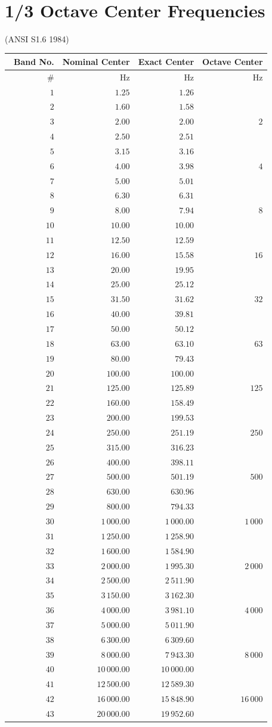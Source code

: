 \documentclass[
]{book}
\begin{document}
~

\hypertarget{octave-center-frequencies}{%
\section{1/3 Octave Center Frequencies}\label{octave-center-frequencies}}

(ANSI S1.6 1984)

\begin{longtable}[]{@{}rrrr@{}}
\toprule
~Band No. & Nominal Center & Exact Center & Octave Center\tabularnewline
\midrule
\endhead
\# & \(\text{Hz}\) & \(\text{Hz}\) & \(\text{Hz}\)\tabularnewline
\(1\) & \(1.25\) & \(1.26\) &\tabularnewline
\(2\) & \(1.60\) & \(1.58\) &\tabularnewline
\(3\) & \(2.00\) & \(2.00\) & \(2\)\tabularnewline
\(4\) & \(2.50\) & \(2.51\) &\tabularnewline
\(5\) & \(3.15\) & \(3.16\) &\tabularnewline
\(6\) & \(4.00\) & \(3.98\) & \(4\)\tabularnewline
\(7\) & \(5.00\) & \(5.01\) &\tabularnewline
\(8\) & \(6.30\) & \(6.31\) &\tabularnewline
\(9\) & \(8.00\) & \(7.94\) & \(8\)\tabularnewline
\(10\) & \(10.00\) & \(10.00\) &\tabularnewline
\(11\) & \(12.50\) & \(12.59\) &\tabularnewline
\(12\) & \(16.00\) & \(15.58\) & \(16\)\tabularnewline
\(13\) & \(20.00\) & \(19.95\) &\tabularnewline
\(14\) & \(25.00\) & \(25.12\) &\tabularnewline
\(15\) & \(31.50\) & \(31.62\) & \(32\)\tabularnewline
\(16\) & \(40.00\) & \(39.81\) &\tabularnewline
\(17\) & \(50.00\) & \(50.12\) &\tabularnewline
\(18\) & \(63.00\) & \(63.10\) & \(63\)\tabularnewline
\(19\) & \(80.00\) & \(79.43\) &\tabularnewline
\(20\) & \(100.00\) & \(100.00\) &\tabularnewline
\(21\) & \(125.00\) & \(125.89\) & \(125\)\tabularnewline
\(22\) & \(160.00\) & \(158.49\) &\tabularnewline
\(23\) & \(200.00\) & \(199.53\) &\tabularnewline
\(24\) & \(250.00\) & \(251.19\) & \(250\)\tabularnewline
\(25\) & \(315.00\) & \(316.23\) &\tabularnewline
\(26\) & \(400.00\) & \(398.11\) &\tabularnewline
\(27\) & \(500.00\) & \(501.19\) & \(500\)\tabularnewline
\(28\) & \(630.00\) & \(630.96\) &\tabularnewline
\(29\) & \(800.00\) & \(794.33\) &\tabularnewline
\(30\) & \(1\,000.00\) & \(1\,000.00\) & \(1\,000\)\tabularnewline
\(31\) & \(1\,250.00\) & \(1\,258.90\) &\tabularnewline
\(32\) & \(1\,600.00\) & \(1\,584.90\) &\tabularnewline
\(33\) & \(2\,000.00\) & \(1\,995.30\) & \(2\,000\)\tabularnewline
\(34\) & \(2\,500.00\) & \(2\,511.90\) &\tabularnewline
\(35\) & \(3\,150.00\) & \(3\,162.30\) &\tabularnewline
\(36\) & \(4\,000.00\) & \(3\,981.10\) & \(4\,000\)\tabularnewline
\(37\) & \(5\,000.00\) & \(5\,011.90\) &\tabularnewline
\(38\) & \(6\,300.00\) & \(6\,309.60\) &\tabularnewline
\(39\) & \(8\,000.00\) & \(7\,943.30\) & \(8\,000\)\tabularnewline
\(40\) & \(10\,000.00\) & \(10\,000.00\) &\tabularnewline
\(41\) & \(12\,500.00\) & \(12\,589.30\) &\tabularnewline
\(42\) & \(16\,000.00\) & \(15\,848.90\) & \(16\,000\)\tabularnewline
\(43\) & \(20\,000.00\) & \(19\,952.60\) &\tabularnewline
\bottomrule
\end{longtable}
\end{document}
